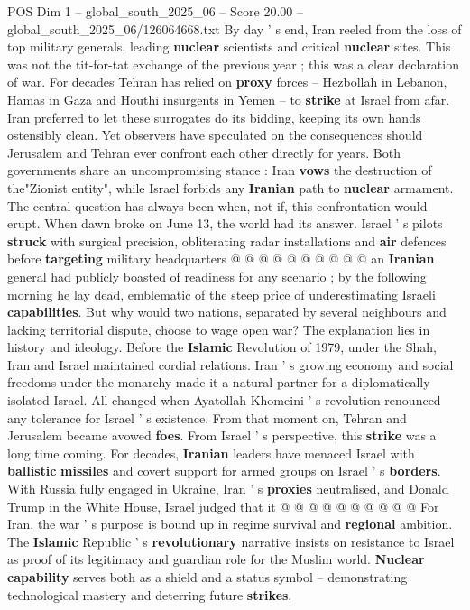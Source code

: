 \begin{textsample}{POS Dim 1 – global\_south\_2025\_06 – Score 20.00 – global\_south\_2025\_06/126064668.txt}  \label{ex:f1_pos_217}
By day ' s end, Iran reeled from the loss of top military generals, leading \textbf{nuclear} scientists and critical \textbf{nuclear} sites.
This was not the tit-for-tat exchange of the previous year ; this was a clear declaration of war.
For decades Tehran has relied on \textbf{proxy} forces -- Hezbollah in Lebanon, Hamas in Gaza and Houthi insurgents in Yemen -- to \textbf{strike} at Israel from afar.
Iran preferred to let these surrogates do its bidding, keeping its own hands ostensibly clean.
Yet observers have speculated on the consequences should Jerusalem and Tehran ever confront each other directly for years.
Both governments share an uncompromising stance : Iran \textbf{vows} the destruction of the"Zionist entity", while Israel forbids any \textbf{Iranian} path to \textbf{nuclear} armament.
The central question has always been when, not if, this confrontation would erupt.
When dawn broke on June 13, the world had its answer.
Israel ' s pilots \textbf{struck} with surgical precision, obliterating radar installations and \textbf{air} defences before \textbf{targeting} military headquarters @ @ @ @ @ @ @ @ @ @ an \textbf{Iranian} general had publicly boasted of readiness for any scenario ; by the following morning he lay dead, emblematic of the steep price of underestimating Israeli \textbf{capabilities}.
But why would two nations, separated by several neighbours and lacking territorial dispute, choose to wage open war?
The explanation lies in history and ideology.
Before the \textbf{Islamic} Revolution of 1979, under the Shah, Iran and Israel maintained cordial relations.
Iran ' s growing economy and social freedoms under the monarchy made it a natural partner for a diplomatically isolated Israel.
All changed when Ayatollah Khomeini ' s revolution renounced any tolerance for Israel ' s existence.
From that moment on, Tehran and Jerusalem became avowed \textbf{foes}.
From Israel ' s perspective, this \textbf{strike} was a long time coming.
For decades, \textbf{Iranian} leaders have menaced Israel with \textbf{ballistic} \textbf{missiles} and covert support for armed groups on Israel ' s \textbf{borders}.
With Russia fully engaged in Ukraine, Iran ' s \textbf{proxies} neutralised, and Donald Trump in the White House, Israel judged that it @ @ @ @ @ @ @ @ @ @ For Iran, the war ' s purpose is bound up in regime survival and \textbf{regional} ambition.
The \textbf{Islamic} Republic ' s \textbf{revolutionary} narrative insists on resistance to Israel as proof of its legitimacy and guardian role for the Muslim world. \textbf{Nuclear} \textbf{capability} serves both as a shield and a status symbol -- demonstrating technological mastery and deterring future \textbf{strikes}.

\end{textsample}
